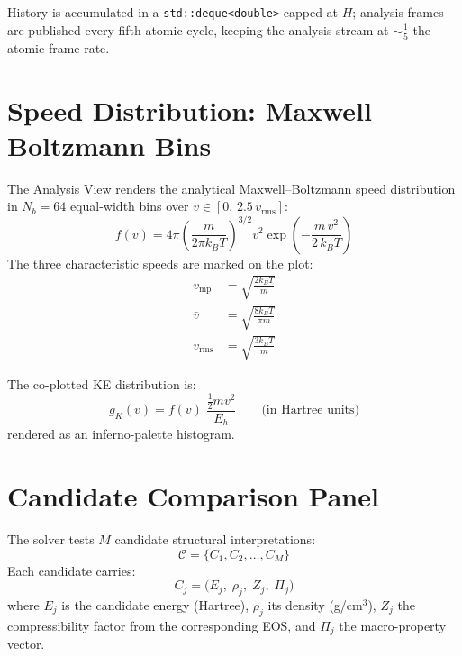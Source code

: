 ﻿\documentclass[11pt]{article}
\begin{document}
History is accumulated in a \texttt{std::deque<double>} capped at $H$;
analysis frames are published every fifth atomic cycle,
keeping the analysis stream at $\sim\tfrac{1}{5}$ the atomic frame rate.

\section{Speed Distribution: Maxwell--Boltzmann Bins}
\label{sec:mb}

The Analysis View renders the analytical Maxwell--Boltzmann speed distribution
in $N_b = 64$ equal-width bins over $v \in [0,\,2.5\,v_\mathrm{rms}]$:
\begin{equation}
  f(v) = 4\pi \left(\frac{m}{2\pi k_B T}\right)^{3/2}
         v^2 \exp\!\left(-\frac{m\,v^2}{2\,k_B T}\right)
\end{equation}
The three characteristic speeds are marked on the plot:
\begin{align}
  v_\mathrm{mp}   &= \sqrt{\frac{2k_B T}{m}} \\[4pt]
  \bar{v}         &= \sqrt{\frac{8k_B T}{\pi m}} \\[4pt]
  v_\mathrm{rms}  &= \sqrt{\frac{3k_B T}{m}}
\end{align}

The co-plotted KE distribution is:
\begin{equation}
  g_K(v) = f(v)\;\frac{\frac{1}{2}m v^2}{E_h}
  \qquad \text{(in Hartree units)}
\end{equation}
rendered as an inferno-palette histogram.

\section{Candidate Comparison Panel}
\label{sec:candidates}

The solver tests $M$ candidate structural interpretations:
\begin{equation}
  \mathcal{C} = \{C_1, C_2, \ldots, C_M\}
\end{equation}
Each candidate carries:
\begin{equation}
  C_j = \bigl(E_j,\;\rho_j,\;Z_j,\;\Pi_j\bigr)
\end{equation}
where $E_j$ is the candidate energy (Hartree), $\rho_j$ its density
(g/cm$^3$), $Z_j$ the compressibility factor from the corresponding EOS,
and $\Pi_j$ the macro-property vector.
\end{document}

